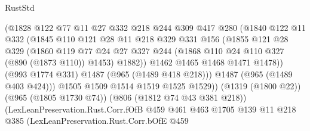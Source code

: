 \begin{lexlean}{RustStd}
\begin{coremodule}
{\begin{coremodule}
{{{{{{{                            (@1828
                              @122
                              @77
                              @11
                              @27
                              @332
                              @218
                              @244
                              @309
                              @417
                              @280
                              (@1840
                                @122
                                @11
                                @332
                                (@1845
                                  @110
                                  @121
                                  @28
                                  @11
                                  @218
                                  @329
                                  @331
                                  @156
                                  (@1855
                                    @121
                                    @28
                                    @329
                                    (@1860
                                      @119
                                      @77
                                      @24
                                      @27
                                      @327
                                      @244
                                      (@1868 @110 @24 @110 @327 (@890 (@1873 @110)) @1453)
                                      @1882))
                                  @1462
                                  @1465
                                  @1468
                                  @1471
                                  @1478))
                              (@993 @1774 @331)
                              @1487
                              (@965 (@1489 @418 @218)))
                            @1487
                            (@965 (@1489 @403 @424)))
                          @1505
                          @1509
                          @1514
                          @1519
                          @1525
                          @1529))
                      (@1319 (@1800 @22))
                      (@965 (@1805 @1730 @74))
                      (@806 (@1812 @74 @43 @381 @218))
                      (LexLeanPreservation.Rust.Corr.fOfB
                        @459
                        @461
                        @463
                        @1705
                        @139
                        @11
                        @218
                        @385
                        (LexLeanPreservation.Rust.Corr.bOfE
                          @459
}}}}}}}
\end{coremodule}}
\end{coremodule}
\end{lexlean}
